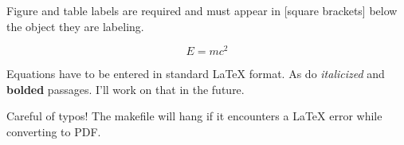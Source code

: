 \documentclass[11pt, oneside]{article}
\begin{document}
Figure and table labels are required and must appear in [square brackets] below the object they are labeling.

\begin{equation}
E = m c^2
\label{eq:optional}
\end{equation}

Equations have to be entered in standard LaTeX format. As do \emph{italicized} and \textbf{bolded} passages. I'll work on that in the future.

Careful of typos! The makefile will hang if it encounters a LaTeX error while converting to PDF.
\end{document}
